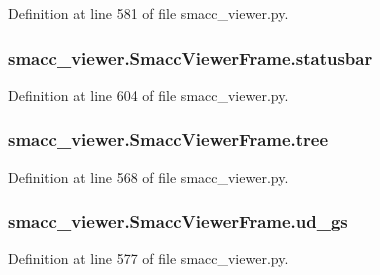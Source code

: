 Definition at line 581 of file smacc\+\_\+viewer.\+py.

\subsubsection[{\texorpdfstring{statusbar}{statusbar}}]{\setlength{\rightskip}{0pt plus 5cm}smacc\+\_\+viewer.\+Smacc\+Viewer\+Frame.\+statusbar}\hypertarget{classsmacc__viewer_1_1SmaccViewerFrame_a17f4cb445baf1ae74641c512c8a71046}{}\label{classsmacc__viewer_1_1SmaccViewerFrame_a17f4cb445baf1ae74641c512c8a71046}


Definition at line 604 of file smacc\+\_\+viewer.\+py.

\subsubsection[{\texorpdfstring{tree}{tree}}]{\setlength{\rightskip}{0pt plus 5cm}smacc\+\_\+viewer.\+Smacc\+Viewer\+Frame.\+tree}\hypertarget{classsmacc__viewer_1_1SmaccViewerFrame_acb413cad9d12ad71bbb44e26ff9149fd}{}\label{classsmacc__viewer_1_1SmaccViewerFrame_acb413cad9d12ad71bbb44e26ff9149fd}


Definition at line 568 of file smacc\+\_\+viewer.\+py.

\subsubsection[{\texorpdfstring{ud\+\_\+gs}{ud_gs}}]{\setlength{\rightskip}{0pt plus 5cm}smacc\+\_\+viewer.\+Smacc\+Viewer\+Frame.\+ud\+\_\+gs}\hypertarget{classsmacc__viewer_1_1SmaccViewerFrame_afde6b1e161cbf76307ebc82f15037163}{}\label{classsmacc__viewer_1_1SmaccViewerFrame_afde6b1e161cbf76307ebc82f15037163}


Definition at line 577 of file smacc\+\_\+viewer.\+py.

